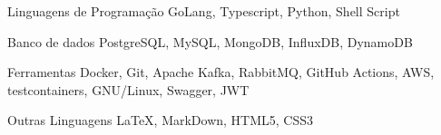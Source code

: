 
\begin{cvskills}
  \cvskill
  {Linguagens de Programação}
  {GoLang, Typescript, Python, Shell Script}

  \cvskill
  {Banco de dados}
  {PostgreSQL, MySQL, MongoDB, InfluxDB, DynamoDB}

  \cvskill
  {Ferramentas}
  { Docker, Git, Apache Kafka, RabbitMQ, GitHub Actions, AWS, testcontainers, GNU/Linux, Swagger, JWT}


  \cvskill
  {Outras Linguagens}
  {LaTeX, MarkDown, HTML5, CSS3}
\end{cvskills}
